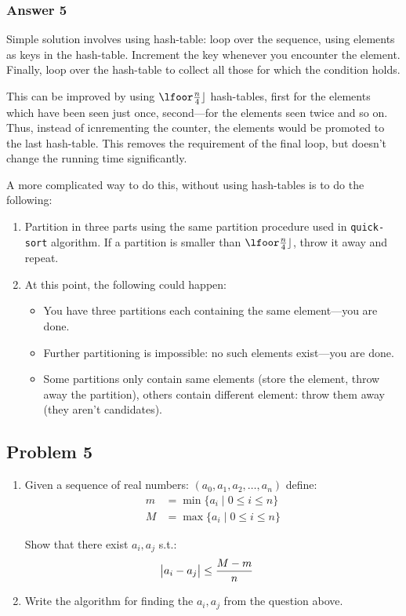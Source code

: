 \documentclass[11pt]{article}
\begin{document}
\subsubsection{Answer 5}
\label{sec-1-4-2}
Simple solution involves using hash-table: loop over the sequence, using
elements as keys in the hash-table.  Increment the key whenever you
encounter the element.  Finally, loop over the hash-table to collect all
those for which the condition holds.

This can be improved by using $\lfoor\frac{n}{4}\rfloor$ hash-tables, first
for the elements which have been seen just once, second---for the elements
seen twice and so on.  Thus, instead of icnrementing the counter, the
elements would be promoted to the last hash-table.  This removes the
requirement of the final loop, but doesn't change the running time
significantly.

A more complicated way to do this, without using hash-tables is to do the
following:
\begin{enumerate}
\item Partition in three parts using the same partition procedure used in
\texttt{quick-sort} algorithm.  If a partition is smaller than
$\lfoor\frac{n}{4}\rfloor$, throw it away and repeat.
\item At this point, the following could happen:
\begin{itemize}
\item You have three partitions each containing the same element---you are
done.
\item Further partitioning is impossible: no such elements exist---you are
done.
\item Some partitions only contain same elements (store the element, throw
away the partition), others contain different element: throw them away
(they aren't candidates).
\end{itemize}
\end{enumerate}

\subsection{Problem 5}
\label{sec-1-5}
\begin{enumerate}
\item Given a sequence of real numbers: $(a_0, a_1, a_2, \dots, a_n)$ define:
\begin{align*}
  m &= \min\{a_i\;|\; 0 \leq i \leq n\} \\
  M &= \max\{a_i\;|\; 0 \leq i \leq n\}
\end{align*}

Show that there exist $a_i, a_j$ s.t.:
\begin{align*}
  \abs{a_i - a_j} &\leq \frac{M - m}{n}
\end{align*}

\item Write the algorithm for finding the $a_i, a_j$ from the question above.
\end{enumerate}
\end{document}
